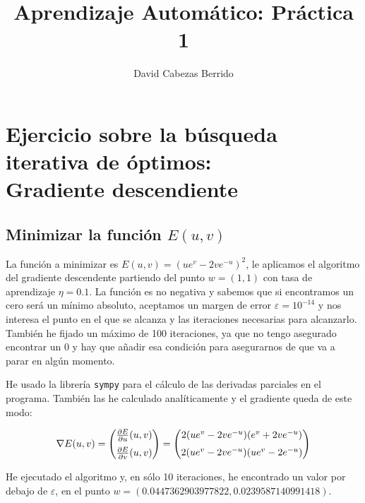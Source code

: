 \documentclass[a4]{article}
\author{David Cabezas Berrido}
\date{\vspace{-5mm}}
\title{\huge Aprendizaje Automático: Práctica 1 \HRule\vspace{-4mm}}
\begin{document}
\maketitle
\tableofcontents

\newpage

\section{Ejercicio sobre la búsqueda iterativa de óptimos: \\ Gradiente descendiente}

\subsection{Minimizar la función $E(u,v)$}

La función a minimizar es $E(u,v)=(ue^v-2ve^{-u})^2$, le aplicamos el algoritmo del gradiente 
descendente partiendo del punto $w=(1,1)$ con tasa de aprendizaje $\eta=0.1$.
La función es no negativa y sabemos que si encontramos un cero será un mínimo absoluto,
aceptamos un margen de error $\varepsilon=10^{-14}$ y nos interesa el punto en el que se alcanza
y las iteraciones necesarias para alcanzarlo. También he fijado un máximo de 100 iteraciones,
ya que no tengo asegurado encontrar un 0 y hay que añadir esa condición para asegurarnos
de que va a parar en algún momento.

He usado la librería \texttt{sympy} para el cálculo de las derivadas parciales en el programa.
También las he calculado analíticamente y el gradiente queda de este modo:

\begin{equation*}
\nabla E(u,v)=
\begin{pmatrix}
\frac{\partial E}{\partial u}(u,v) \vspace{2mm}\\
\frac{\partial E}{\partial v}(u,v)
\end{pmatrix}=
\begin{pmatrix}
    2(ue^v-2ve^{-u})(e^v+2ve^{-u}) \vspace{2mm}\\
    2(ue^v-2ve^{-u})(ue^v-2e^{-u})
    \end{pmatrix}
\end{equation*}

He ejecutado el algoritmo y, en sólo 10 iteraciones, he encontrado un valor por debajo de $\varepsilon$,
en el punto $w=(0.0447362903977822,0.0239587140991418)$.
\end{document}
